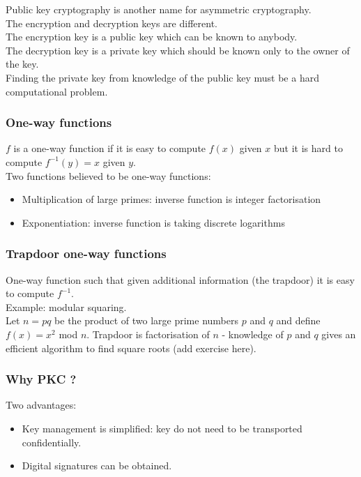 \documentclass{article}
\begin{document}
Public key cryptography is another name for asymmetric cryptography.\\
The encryption and decryption keys are different.\\
The encryption key is a public key which can be known to anybody.\\
The decryption key is a private key which should be known only to the owner of the key.\\
Finding the private key from knowledge of the public key must be a hard computational problem.

\subsubsection{One-way functions}

$f$ is a one-way function if it is easy to compute $f(x)$ given $x$ but it is hard to compute $f^{-1}(y)=x$ given $y$.\\
Two functions believed to be one-way functions:
\begin{itemize}
    \item Multiplication of large primes: inverse function is integer factorisation
    \item Exponentiation: inverse function is taking discrete logarithms
\end{itemize}

\subsubsection{Trapdoor one-way functions}

One-way function such that given additional information (the trapdoor) it is easy to compute $f^{-1}$.\\
Example: modular squaring.\\
Let $n=pq$ be the product of two large prime numbers $p$ and $q$ and define $f(x)=x^2$ mod $n$. Trapdoor is factorisation of $n$ - knowledge of $p$ and $q$ gives an efficient algorithm to find square roots (add exercise here).

\subsubsection{Why PKC ?}

Two advantages:
\begin{itemize}
    \item Key management is simplified: key do not need to be transported confidentially.
    \item Digital signatures can be obtained.
\end{itemize}
\end{document}
